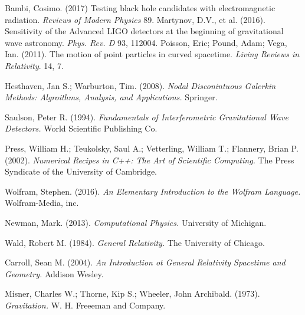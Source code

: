  Bambi, Cosimo. (2017) Testing black hole candidates with electromagnetic radiation. {\em Reviews of Modern Physics} 89.
  Martynov, D.V., et al. (2016). Sensitivity of the Advanced LIGO detectors at the beginning of gravitational wave astronomy. {\em Phys. Rev. D} 93, 112004.
  Poisson, Eric; Pound, Adam; Vega, Ian. (2011). The motion of point particles in curved spacetime. {\em Living Reviews in Relativity}. 14, 7. 

 Hesthaven, Jan S.; Warburton, Tim. (2008). {\em Nodal Disconintuous Galerkin Methods: Algroithms, Analysis, and Applications.} Springer.

 Saulson, Peter R. (1994). {\em Fundamentals of Interferometric Gravitational Wave Detectors.} World Scientific Publishing Co.

 Press, William H.; Teukolsky, Saul A.; Vetterling, William T.; Flannery, Brian P. (2002). {\em Numerical Recipes in C++: The Art of Scientific Computing.} The Press Syndicate of the University of Cambridge.

 Wolfram, Stephen. (2016). {\em An Elementary Introduction to the Wolfram Language.} Wolfram-Media, inc.

 Newman, Mark. (2013). {\em Computational Physics.} University of Michigan.

Wald, Robert M. (1984). {\em General Relativity.} The University of Chicago.

Carroll, Sean M. (2004). {\em An Introduction ot General Relativity Spacetime and Geometry.} Addison Wesley.

Misner, Charles W.; Thorne, Kip S.; Wheeler, John Archibald. (1973). {\em Gravitation.} W. H. Freeeman and Company. 

